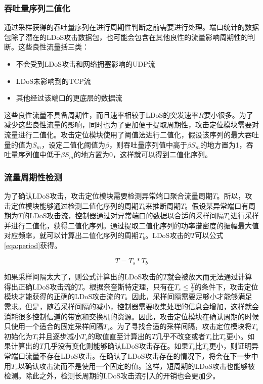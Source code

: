 \subsubsection{吞吐量序列二值化}
\label{chap4:binarization}
通过采样获得的吞吐量序列在进行周期性判断之前需要进行处理。端口统计的数据包除了潜在的LDoS攻击数据包，也可能会包含在其他良性的流量影响周期性的判断。这些良性流量括三类：
\begin{itemize}
	\item 不会受到LDoS攻击和网络拥塞影响的UDP流
	\item LDoS未影响到的TCP流
	\item 其他经过该端口的更底层的数据流
\end{itemize}
这些良性流量不具备周期性，而且速率相较于LDoS的突发速率$R$要小很多。为了减少这些良性流量的影响，同时也为了更加便于提取周期性，攻击定位模块需要对流量进行二值化。攻击定位模块使用了阈值法进行二值化，假设该序列的最大吞吐量的值为$S_m$，设定二值化阈值为$\beta$，则吞吐量序列值中高于$\beta S_m$的地方置为1，吞吐量序列值中低于$\beta S_m$的地方置为0，这样就可以得到二值化序列。

\subsubsection{流量周期性检测}
为了确认LDoS攻击，攻击定位模块需要检测异常端口聚合流量周期$T$。所以，攻击定位模块能够通过检测二值化序列的周期$T_b$来推断周期$T$。假设某异常端口有周期为$T$的LDoS攻击流，控制器通过对异常端口的数据以合适的采样间隔$T_s$进行采样并进行二值化，获得二值化序列。通过提取二值化序列的功率谱密度的振幅最大值对应频率，就可以计算出二值化序列的周期$T_b$。LDoS攻击的$T$可以公式\ref{eqa:period}获得。

\begin{equation}
	\label{eqa:period}
	T = T_s * T_b
\end{equation}

如果采样间隔太大了，则公式计算出的LDoS攻击的$T$就会被放大而无法通过计算得出正确LDoS攻击流的$T$。根据奈奎斯特定理，只有在$T_s \le \frac{T}{2}$的条件下，攻击定位模块才能获得的正确的LDoS攻击流的$T$。因此，采样间隔需要足够小才能够满足需求。但是，随着采样间隔的减小，控制器需要收集处理的信息会增加，这样就会消耗很多控制信道的带宽和交换机的资源。因此，攻击定位模块在确认周期的时候只使用一个适合的固定采样间隔$T_s$。为了寻找合适的采样间隔，攻击定位模块将$T_s$初始化为$T_i$并且逐步减小$T_s$的取值直至计算出的$T$几乎不改变或者$T_s$比$T_e$更小。如果计算出的$T$几乎没有变化则能够确认LDoS攻击存在。如果$T_s$比$T_e$更小，则证明异常端口流量不存在LDoS攻击。在确认了LDoS攻击存在的情况下，将会在下一步中用$T_s$以确认攻击流而不是使用一个固定的值。这样，短周期的LDoS攻击也能够被检测。除此之外，检测长周期的LDoS攻击流引入的开销也会更加少。

